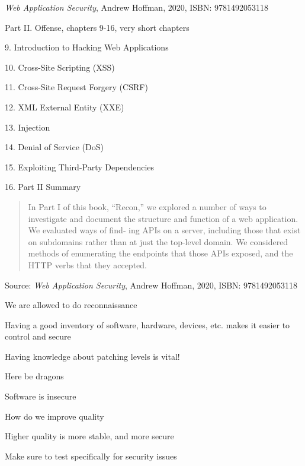 \documentclass[Screen16to9,17pt]{foils}
\begin{document}

\emph{Web Application Security}, Andrew Hoffman, 2020, ISBN: 9781492053118

\begin{list1}
\item Part II. Offense, chapters 9-16, very short chapters
\item 9. Introduction to Hacking Web Applications
\item 10. Cross-Site Scripting (XSS)
\item 11. Cross-Site Request Forgery (CSRF)
\item 12. XML External Entity (XXE)
\item 13. Injection
\item 14. Denial of Service (DoS)
\item 15. Exploiting Third-Party Dependencies
\item 16. Part II Summary
\end{list1}



\begin{quote}
  In Part I of this book, “Recon,” we explored a number of ways to investigate and
  document the structure and function of a web application. We evaluated ways of find‐
  ing APIs on a server, including those that exist on subdomains rather than at just the
  top-level domain. We considered methods of enumerating the endpoints that those
  APIs exposed, and the HTTP verbs that they accepted.
\end{quote}
Source: \emph{Web Application Security}, Andrew Hoffman, 2020, ISBN: 9781492053118


\begin{list2}
\item We are allowed to do reconnaissance
\item Having a good inventory of software, hardware, devices, etc. makes it easier to control and secure
\item Having knowledge about patching levels is vital!
\end{list2}





Here be dragons
\begin{list2}
\item Software is insecure
\item How do we improve quality
\item Higher quality is more stable, and more secure
\item Make sure to test specifically for security issues
\end{list2}
\end{document}
